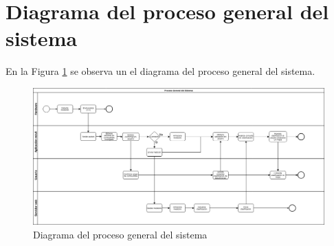 \section{Diagrama del proceso general del sistema}
En la Figura \ref{fig:proceso_general} se observa un el diagrama del proceso general del sistema.
\begin{figure}[H]
	\centering
	\includegraphics[scale=.35]{Capitulo4/images/proceso_general}
	\caption{Diagrama del proceso general del sistema}
	\label{fig:proceso_general}
\end{figure}